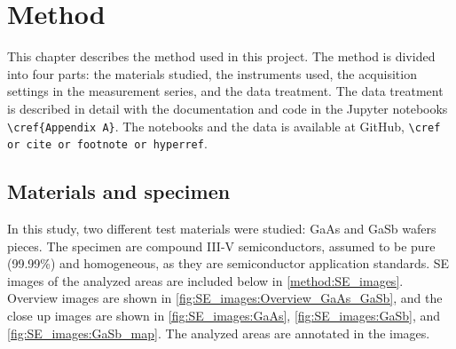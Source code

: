 \chapter{Method}
\label{ch:method}


This chapter describes the method used in this project.
The method is divided into four parts: the materials studied, the instruments used, the acquisition settings in the measurement series, and the data treatment.
The data treatment is described in detail with the documentation and code in the Jupyter notebooks \verb|\cref{Appendix A}|.
The notebooks and the data is available at GitHub, \verb|\cref or cite or footnote or hyperref|.










\section{Materials and specimen}
\label{method:materials}

In this study, two different test materials were studied: GaAs and GaSb wafers pieces.
The specimen are compound III-V semiconductors, assumed to be pure (99.99\%) and homogeneous, as they are semiconductor application standards.
SE images of the analyzed areas are included below in \cref{method:SE_images}.
Overview images are shown in \cref{fig:SE_images:Overview_GaAs_GaSb}, and the close up images are shown in \cref{fig:SE_images:GaAs}, \cref{fig:SE_images:GaSb}, and \cref{fig:SE_images:GaSb_map}.
The analyzed areas are annotated in the images.


